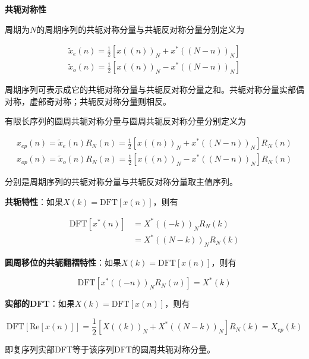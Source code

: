 \documentclass[cn, hazy, blue, normal, 12pt]{elegantnote}
\begin{document}
\textbf{共轭对称性}

周期为$N$的周期序列的共轭对称分量与共轭反对称分量分别定义为

\begin{equation}
\begin{aligned}
    \widetilde{x}_e(n)=\frac{1}{2}\left[{x}((n))_N+{x}^*((N-n))_N\right] \\ 
    \widetilde{x}_o(n)=\frac{1}{2}\left[{x}((n))_N-{x}^*((N-n))_N\right]
\end{aligned}
\end{equation}

周期序列可表示成它的共轭对称分量与共轭反对称分量之和。共轭对称分量实部偶对称，虚部奇对称；共轭反对称分量则相反。

有限长序列的圆周共轭对称分量与圆周共轭反对称分量分别定义为

\begin{equation}
\begin{aligned}
    {x}_{ep}(n)=\widetilde{x}_e(n)R_N(n)=\frac{1}{2}\left[{x}((n))_N+{x}^*((N-n))_N\right]R_N(n) \\ 
    {x}_{op}(n)=\widetilde{x}_o(n)R_N(n)=\frac{1}{2}\left[{x}((n))_N-{x}^*((N-n))_N\right]R_N(n)
\end{aligned}
\end{equation}

分别是周期序列的共轭对称分量与共轭反对称分量取主值序列。

\textbf{共轭特性}：如果$X(k)=\text{DFT}[x(n)]$，则有

\begin{equation}
\begin{aligned}
    \text{DFT}[x^*(n)]&=X^*((-k))_N R_N(k) \\
    &=X^*((N-k))_N R_N(k)
\end{aligned}
\end{equation}

\textbf{圆周移位的共轭翻褶特性}：如果$X(k)=\text{DFT}[x(n)]$，则有

\begin{equation}
    \text{DFT}[x^*((-n))_N R_N(n)]=X^*(k)
\end{equation}

\textbf{实部的DFT}：如果$X(k)=\text{DFT}[x(n)]$，则有

\begin{equation}
    \text{DFT}[\text{Re}[x(n)]]=\frac{1}{2}[X((k))_N+X^*((N-k))_N]R_N(k)=X_{ep}(k)
\end{equation}

即复序列实部DFT等于该序列DFT的圆周共轭对称分量。
\end{document}
